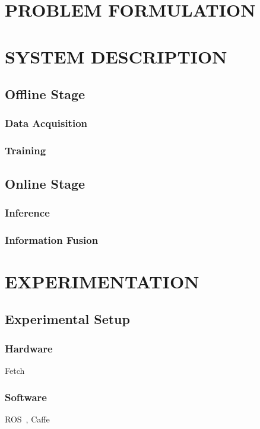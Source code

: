 \documentclass[conference]{IEEEtran}
\begin{document}
  \section{\label{sec-PF}PROBLEM FORMULATION}

  \section{\label{sec-SD}SYSTEM DESCRIPTION}
    \subsection{Offline Stage}

      \subsubsection{Data Acquisition}

      \subsubsection{Training}

    \subsection{Online Stage}

      \subsubsection{Inference}

      \subsubsection{Information Fusion}


  \section{\label{sec-EX}EXPERIMENTATION}
    \subsection{Experimental Setup}
      \subsubsection{Hardware}
        Fetch~\cite{ackerman2015fetch}
      \subsubsection{Software}
        ROS~\cite{quigley2009ros}, Caffe~\cite{jia2014caffe}
\end{document}
